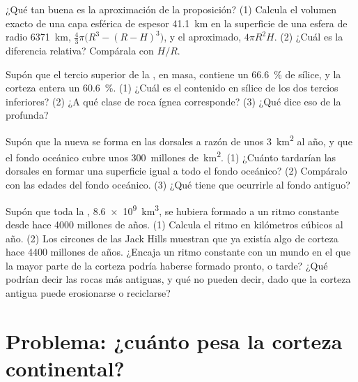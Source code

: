 \begin{exercise}[$\star\star\star$]\label{exo:g12:continental-crust:12}
¿Qué tan buena es la aproximación de la proposición? (1) Calcula el volumen
exacto de una capa esférica de espesor \qty{41.1}{km} en la superficie de una
esfera de radio \qty{6371}{km}, $\tfrac{4}{3}\pi\bigl(R^3 - (R - H)^3\bigr)$,
y el aproximado, $4\pi R^2 H$. (2) ¿Cuál es la diferencia relativa?
Compárala con $H/R$.
\end{exercise}

\begin{exercise}[$\star\star\star$]\label{exo:g12:continental-crust:13}
Supón que el tercio superior de la , en masa, contiene un
\qty{66.6}{\percent} de sílice, y la corteza entera un \qty{60.6}{\percent}.
(1) ¿Cuál es el contenido en sílice de los dos tercios inferiores? (2) ¿A qué
clase de roca ígnea corresponde? (3) ¿Qué dice eso de la 
profunda?
\end{exercise}

\begin{exercise}[$\star\star\star$]\label{exo:g12:continental-crust:14}
Supón que la nueva  se forma en las dorsales a razón de unos
\qty{3}{km^2} al año, y que el fondo oceánico cubre unos
\num{300}~millones de~\unit{km^2}. (1) ¿Cuánto tardarían las dorsales en
formar una superficie igual a todo el fondo oceánico? (2) Compáralo con las
edades del fondo oceánico. (3) ¿Qué tiene que ocurrirle al fondo antiguo?
\end{exercise}

\begin{exercise}[$\star\star\star$]\label{exo:g12:continental-crust:15}
Supón que toda la , \qty{8.6e9}{km^3}, se hubiera formado
a un ritmo constante desde hace 4000 millones de años. (1) Calcula el ritmo en
kilómetros cúbicos al año. (2) Los circones de las Jack Hills muestran que ya
existía algo de corteza hace 4400 millones de años. ¿Encaja un ritmo
constante con un mundo en el que la mayor parte de la corteza podría haberse
formado pronto, o tarde? ¿Qué podrían decir las rocas más antiguas, y qué no
pueden decir, dado que la corteza antigua puede erosionarse o reciclarse?
\end{exercise}

\section{Problema: ¿cuánto pesa la corteza continental?}


